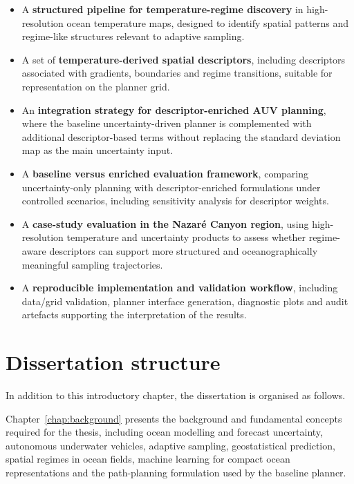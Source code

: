 \begin{itemize}
  \item A \textbf{structured pipeline for temperature-regime discovery} in high-resolution ocean temperature maps, designed to identify spatial patterns and regime-like structures relevant to adaptive sampling.

  \item A set of \textbf{temperature-derived spatial descriptors}, including descriptors associated with gradients, boundaries and regime transitions, suitable for representation on the planner grid.

  \item An \textbf{integration strategy for descriptor-enriched AUV planning}, where the baseline uncertainty-driven planner is complemented with additional descriptor-based terms without replacing the standard deviation map as the main uncertainty input.

  \item A \textbf{baseline versus enriched evaluation framework}, comparing uncertainty-only planning with descriptor-enriched formulations under controlled scenarios, including sensitivity analysis for descriptor weights.

  \item A \textbf{case-study evaluation in the Nazaré Canyon region}, using high-resolution temperature and uncertainty products to assess whether regime-aware descriptors can support more structured and oceanographically meaningful sampling trajectories.

  \item A \textbf{reproducible implementation and validation workflow}, including data/grid validation, planner interface generation, diagnostic plots and audit artefacts supporting the interpretation of the results.
\end{itemize}

\section{Dissertation structure} \label{sec:struct}

In addition to this introductory chapter, the dissertation is organised as follows.

Chapter~\ref{chap:background} presents the background and fundamental concepts required for the thesis, including ocean modelling and forecast uncertainty, autonomous underwater vehicles, adaptive sampling, geostatistical prediction, spatial regimes in ocean fields, machine learning for compact ocean representations and the path-planning formulation used by the baseline planner.

